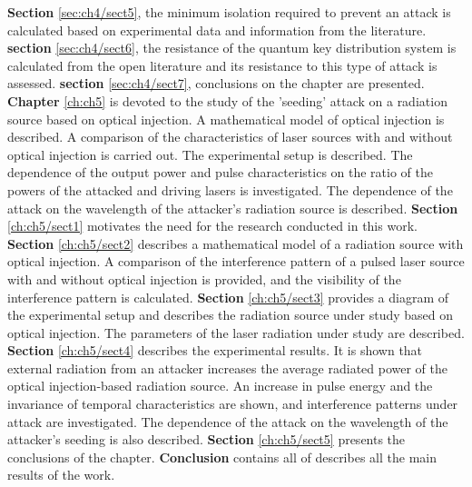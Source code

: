\newline \textbf{Section} \ref{sec:ch4/sect5}, the minimum isolation required to prevent an attack is calculated based on experimental data and information from the literature.
\newline \textbf{section} \ref{sec:ch4/sect6}, the resistance of the quantum key distribution system is calculated from the open literature and its resistance to this type of attack is assessed.
\newline \textbf{section} \ref{sec:ch4/sect7}, conclusions on the chapter are presented.
\newline \textbf{Chapter} \ref{ch:ch5} is devoted to the study of the 'seeding' attack on a radiation source based on optical injection. A mathematical model of optical injection is described. A comparison of the characteristics of laser sources with and without optical injection is carried out. The experimental setup is described. The dependence of the output power and pulse characteristics on the ratio of the powers of the attacked and driving lasers is investigated. The dependence of the attack on the wavelength of the attacker's radiation source is described.
\newline \textbf{Section} \ref{ch:ch5/sect1} motivates the need for the research conducted in this work.
\newline \textbf{Section} \ref{ch:ch5/sect2} describes a mathematical model of a radiation source with optical injection. A comparison of the interference pattern of a pulsed laser source with and without optical injection is provided, and the visibility of the interference pattern is calculated.
\newline \textbf{Section} \ref{ch:ch5/sect3} provides a diagram of the experimental setup and describes the radiation source under study based on optical injection. The parameters of the laser radiation under study are described.
\newline \textbf{Section} \ref{ch:ch5/sect4} describes the experimental results. It is shown that external radiation from an attacker increases the average radiated power of the optical injection-based radiation source. An increase in pulse energy and the invariance of temporal characteristics are shown, and interference patterns under attack are investigated. The dependence of the attack on the wavelength of the attacker's seeding is also described.
\newline \textbf{Section} \ref{ch:ch5/sect5} presents the conclusions of the chapter.
\newline \textbf {Conclusion} contains all of describes all the main results of the work.
